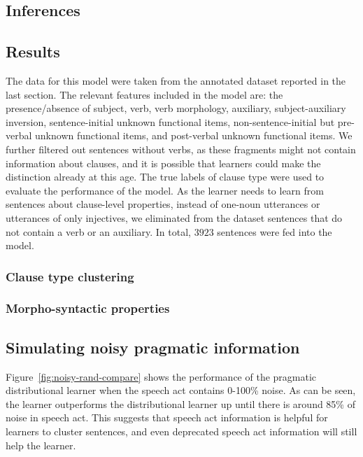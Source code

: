 \subsection{Inferences}
\label{sec:engcl:model:infer}

\subsection{Results}
\label{sec:engcl:model:results}
The data for this model were taken from the annotated dataset reported in the last section. The relevant features included in the model are: the presence/absence of subject, verb, verb morphology, auxiliary, subject-auxiliary inversion, sentence-initial unknown functional items, non-sentence-initial but pre-verbal unknown functional items, and post-verbal unknown functional items. We further filtered out sentences without verbs, as these fragments might not contain information about clauses, and it is possible that learners could make the distinction already at this age. The true labels of clause type were used to evaluate the performance of the model. As the learner needs to learn from sentences about clause-level properties, instead of one-noun utterances or utterances of only injectives, we eliminated from the dataset sentences that do not contain a verb or an auxiliary. In total, $3923$  sentences were fed into the model.


\subsubsection{Clause type clustering}
\label{sec:engcl:model:data}




\subsubsection{Morpho-syntactic properties}
\label{sec:engcl:model:results}




\subsection{Simulating noisy pragmatic information} 
\label{sec:engcl:model:noisy}
Figure~\ref{fig:noisy-rand-compare} shows the performance of the pragmatic distributional learner when the speech act contains 0-100\% noise. As can be seen, the learner outperforms the distributional learner up until there is around 85\% of noise in speech act. This suggests that speech act information is helpful for learners to cluster sentences, and even deprecated speech act information will still help the learner.  

